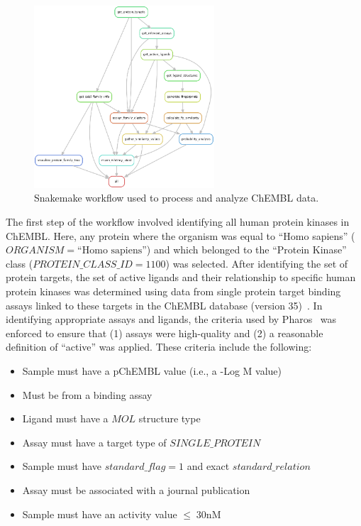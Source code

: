 \documentclass[11pt]{article}
\begin{document}
\begin{figure}[H]
    \centering
    \includegraphics[width=0.6\textwidth]{../figures/rulegraph.png}
    \caption{Snakemake workflow used to process and analyze ChEMBL data.}\label{fig:snakemake_workflow}
\end{figure}

The first step of the workflow involved identifying all human protein kinases in ChEMBL. 
Here, any protein where the organism was equal to ``Homo sapiens'' ($ORGANISM=\text{``Homo sapiens''}$) and which belonged to the ``Protein Kinase'' class ($PROTEIN\_CLASS\_ID=1100$) was selected.
After identifying the set of protein targets, the set of active ligands and their relationship to specific human protein kinases was determined using data from single protein target binding assays linked to these targets in the ChEMBL database (version 35)~\cite{chembl_db_2023}. 
In identifying appropriate assays and ligands, the criteria used by Pharos~\cite{pharos_2022} was enforced to ensure that (1) assays were high-quality and (2) a reasonable definition of ``active'' was applied. 
These criteria include the following:
\begin{itemize}
    \item Sample must have a pChEMBL value (i.e., a -Log M value)
    \item Must be from a binding assay
    \item Ligand must have a $MOL$ structure type
    \item Assay must have a target type of $SINGLE\_PROTEIN$
    \item Sample must have $standard\_flag = 1$ and exact $standard\_relation$
    \item Assay must be associated with a journal publication
    \item Sample must have an activity value $\leq \; 30 \text{nM}$
\end{itemize}
\end{document}
